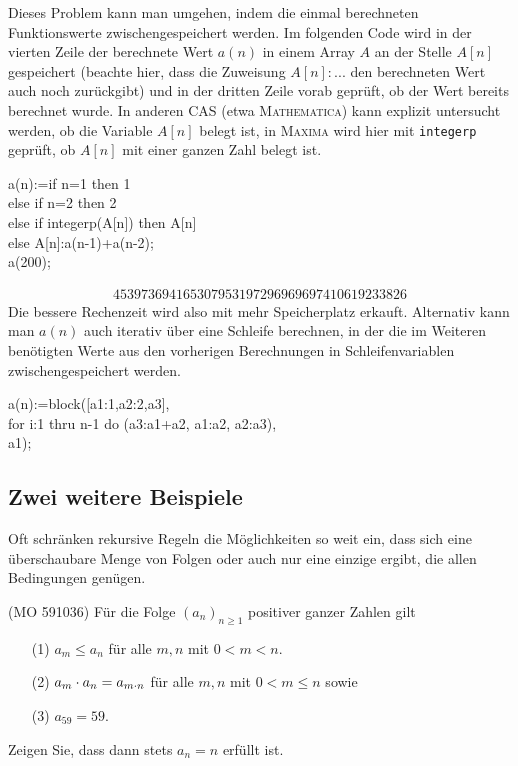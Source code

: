 \documentclass[11pt,a4paper]{article}
\newcommand{\cas}[1]{\textsc{#1}}
\begin{document}
Dieses Problem kann man umgehen, indem die einmal berechneten Funktionswerte
zwischengespeichert werden.  Im folgenden Code wird in der vierten Zeile der
berechnete Wert $a(n)$ in einem Array $A$ an der Stelle $A[n]$ gespeichert
(beachte hier, dass die Zuweisung $A[n]:...$ den berechneten Wert auch noch
zurückgibt) und in der dritten Zeile vorab geprüft, ob der Wert bereits
berechnet wurde. In anderen CAS (etwa \cas{Mathematica}) kann explizit
untersucht werden, ob die Variable $A[n]$ belegt ist, in \cas{Maxima} wird
hier mit \texttt{integerp} geprüft, ob $A[n]$ mit einer ganzen Zahl belegt
ist. 
\begin{code}
  a(n):=if n=1 then 1\+\\
  else if n=2 then 2\\
  else if integerp(A[n]) then A[n]\\
  else A[n]:a(n-1)+a(n-2);\-\\[4pt]
  a(200);
\end{code}
\begin{gather*}
  453973694165307953197296969697410619233826
\end{gather*}
Die bessere Rechenzeit wird also mit mehr Speicherplatz erkauft. Alternativ
kann man $a(n)$ auch iterativ über eine Schleife berechnen, in der die im
Weiteren benötigten Werte aus den vorherigen Berechnungen in
Schleifenvariablen zwischengespeichert werden.
\begin{code}
  a(n):=block([a1:1,a2:2,a3],\+\\
  for i:1 thru n-1 do (a3:a1+a2, a1:a2, a2:a3),\\
  a1);
\end{code}

\subsection{Zwei weitere Beispiele}

Oft schränken rekursive Regeln die Möglichkeiten so weit ein, dass sich eine
überschaubare Menge von Folgen oder auch nur eine einzige ergibt, die allen
Bedingungen genügen. 

\begin{aufgabe} (MO 591036)
  Für die Folge $(a_n)_{n\ge 1}$ positiver ganzer Zahlen gilt 
  \begin{itemize}
  \item[(1)] $a_m\le a_n$ für alle $m,n$ mit $0<m<n$.
  \item[(2)] $a_m\cdot a_n=a_{m\cdot n}$ für alle $m,n$ mit $0<m\le n$ sowie
  \item[(3)] $a_{59}=59$.
  \end{itemize}
  Zeigen Sie, dass dann stets $a_n=n$ erfüllt ist.
\end{aufgabe}
\end{document}

